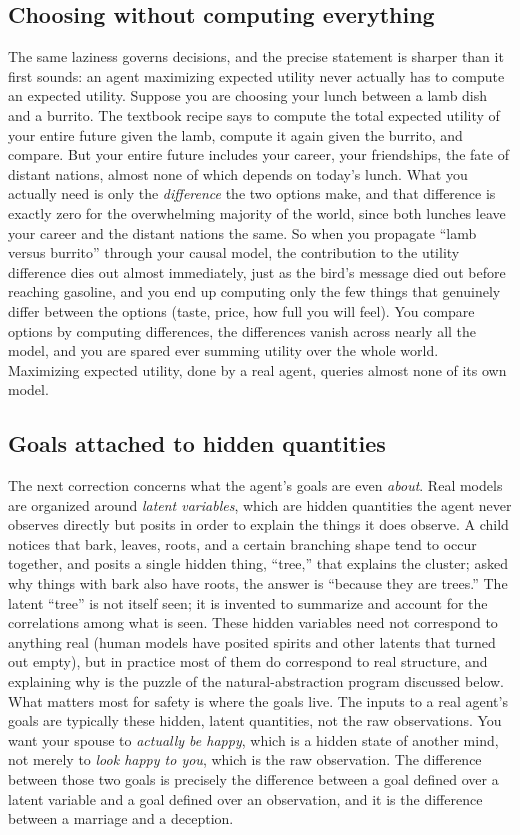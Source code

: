 \documentclass[10pt]{article}
\theoremstyle{definition}
\theoremstyle{remark}
\begin{document}
\subsection{Choosing without computing everything}

The same laziness governs decisions, and the precise statement is sharper than it first sounds: an agent maximizing expected utility never actually has to compute an expected utility. Suppose you are choosing your lunch between a lamb dish and a burrito. The textbook recipe says to compute the total expected utility of your entire future given the lamb, compute it again given the burrito, and compare. But your entire future includes your career, your friendships, the fate of distant nations, almost none of which depends on today's lunch. What you actually need is only the \emph{difference} the two options make, and that difference is exactly zero for the overwhelming majority of the world, since both lunches leave your career and the distant nations the same. So when you propagate ``lamb versus burrito'' through your causal model, the contribution to the utility difference dies out almost immediately, just as the bird's message died out before reaching gasoline, and you end up computing only the few things that genuinely differ between the options (taste, price, how full you will feel). You compare options by computing differences, the differences vanish across nearly all the model, and you are spared ever summing utility over the whole world. Maximizing expected utility, done by a real agent, queries almost none of its own model.

\subsection{Goals attached to hidden quantities}

The next correction concerns what the agent's goals are even \emph{about}. Real models are organized around \emph{latent variables}, which are hidden quantities the agent never observes directly but posits in order to explain the things it does observe. A child notices that bark, leaves, roots, and a certain branching shape tend to occur together, and posits a single hidden thing, ``tree,'' that explains the cluster; asked why things with bark also have roots, the answer is ``because they are trees.'' The latent ``tree'' is not itself seen; it is invented to summarize and account for the correlations among what is seen. These hidden variables need not correspond to anything real (human models have posited spirits and other latents that turned out empty), but in practice most of them do correspond to real structure, and explaining why is the puzzle of the natural-abstraction program discussed below. What matters most for safety is where the goals live. The inputs to a real agent's goals are typically these hidden, latent quantities, not the raw observations. You want your spouse to \emph{actually be happy}, which is a hidden state of another mind, not merely to \emph{look happy to you}, which is the raw observation. The difference between those two goals is precisely the difference between a goal defined over a latent variable and a goal defined over an observation, and it is the difference between a marriage and a deception.
\end{document}
